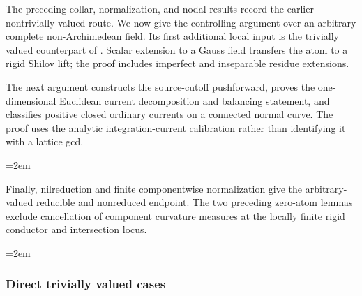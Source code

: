 The preceding collar, normalization, and nodal results record the earlier
nontrivially valued route.  We now give the controlling argument over an
arbitrary complete non-Archimedean field.  Its first additional local input is
the trivially valued counterpart of
.  Scalar extension to a
Gauss field transfers the atom to a rigid Shilov lift; the proof includes
imperfect and inseparable residue extensions.




The next argument constructs the source-cutoff pushforward, proves the
one-dimensional Euclidean current decomposition and balancing statement, and
classifies positive closed ordinary currents on a connected normal curve.
The proof uses the analytic integration-current calibration rather than
identifying it with a lattice gcd.


\begingroup
\emergencystretch=2em

\endgroup

Finally, nilreduction and finite componentwise normalization give the
arbitrary-valued reducible and nonreduced endpoint.  The two preceding
zero-atom lemmas exclude cancellation of component curvature measures at the
locally finite rigid conductor and intersection locus.


\begingroup
\emergencystretch=2em

\endgroup

\subsubsection{Direct trivially valued cases}
\label{sec:ch16-direct-trivially-valued-curves}


